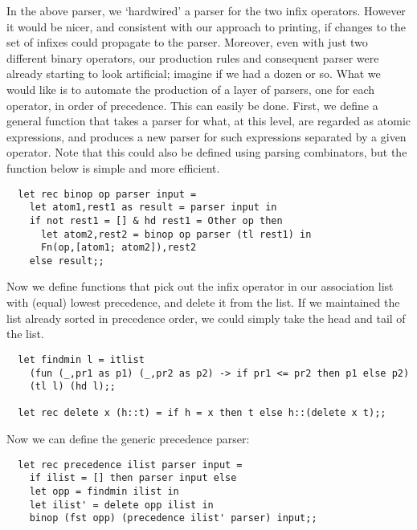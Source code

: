 In the above parser, we `hardwired' a parser for the two infix operators.
However it would be nicer, and consistent with our approach to printing, if
changes to the set of infixes could propagate to the parser. Moreover, even
with just two different binary operators, our production rules and consequent
parser were already starting to look artificial; imagine if we had a dozen or
so. What we would like is to automate the production of a layer of parsers, one
for each operator, in order of precedence. This can easily be done. First, we
define a general function that takes a parser for what, at this level, are
regarded as atomic expressions, and produces a new parser for such expressions
separated by a given operator. Note that this could also be defined using
parsing combinators, but the function below is simple and more efficient.

\begin{boxed}\begin{verbatim}
  let rec binop op parser input =
    let atom1,rest1 as result = parser input in
    if not rest1 = [] & hd rest1 = Other op then
      let atom2,rest2 = binop op parser (tl rest1) in
      Fn(op,[atom1; atom2]),rest2
    else result;;
\end{verbatim}\end{boxed}

Now we define functions that pick out the infix operator in our association
list with (equal) lowest precedence, and delete it from the list. If we
maintained the list already sorted in precedence order, we could simply take
the head and tail of the list.

\begin{boxed}\begin{verbatim}
  let findmin l = itlist
    (fun (_,pr1 as p1) (_,pr2 as p2) -> if pr1 <= pr2 then p1 else p2)
    (tl l) (hd l);;

  let rec delete x (h::t) = if h = x then t else h::(delete x t);;
\end{verbatim}\end{boxed}

\noindent Now we can define the generic precedence parser:

\begin{boxed}\begin{verbatim}
  let rec precedence ilist parser input =
    if ilist = [] then parser input else
    let opp = findmin ilist in
    let ilist' = delete opp ilist in
    binop (fst opp) (precedence ilist' parser) input;;
\end{verbatim}\end{boxed}

